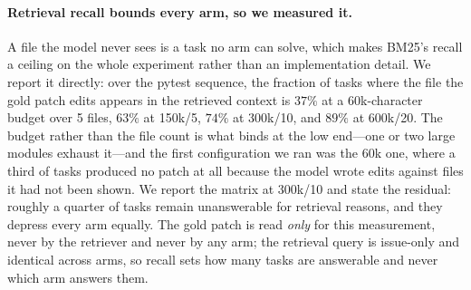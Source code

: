 \paragraph{Retrieval recall bounds every arm, so we measured it.}
A file the model never sees is a task no arm can solve, which makes
BM25's recall a ceiling on the whole experiment rather than an
implementation detail. We report it directly: over the pytest sequence,
the fraction of tasks where the file the gold patch edits appears in the
retrieved context is $37\%$ at a 60k-character budget over 5 files,
$63\%$ at 150k/5, $74\%$ at 300k/10, and $89\%$ at 600k/20. The budget
rather than the file count is what binds at the low end---one or two
large modules exhaust it---and the first configuration we ran was the
60k one, where a third of tasks produced no patch at all because the
model wrote edits against files it had not been shown. We report the
matrix at 300k/10 and state the residual: roughly a quarter of tasks
remain unanswerable for retrieval reasons, and they depress every arm
equally. The gold patch is read \emph{only} for this measurement, never
by the retriever and never by any arm; the retrieval query is issue-only
and identical across arms, so recall sets how many tasks are answerable
and never which arm answers them.


